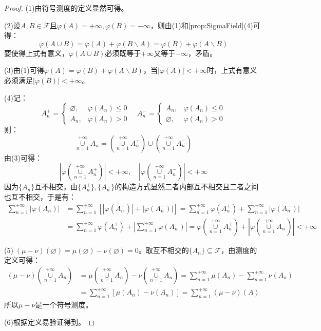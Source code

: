 \begin{proof}
	(1)由符号测度的定义显然可得。\par
	(2)设$A,B\in\mathscr{F}$且$\varphi(A)=+\infty,\varphi(B)=-\infty$，则由(1)和\cref{prop:SigmaField}(4)可得：
	\begin{equation*}
		\varphi(A\cup B)=\varphi(A)+\varphi(B\backslash A)=\varphi(B)+\varphi(A\backslash B)
	\end{equation*}
	要使得上式有意义，$\varphi(A\cup B)$必须既等于$+\infty$又等于$-\infty$，矛盾。\par
	(3)由(1)可得$\varphi(A)=\varphi(B)+\varphi(A\backslash B)$，当$|\varphi(A)|<+\infty$时，上式有意义必须满足$|\varphi(B)|<+\infty$。\par
	(4)记：
	\begin{equation*}
		A_n^+=
		\begin{cases}
			\varnothing,&\varphi(A_n)\leqslant0 \\
			A_n,&\varphi(A_n)>0
		\end{cases}
		\quad
		A_n^-=
		\begin{cases}
			A_n,&\varphi(A_n)\leqslant0 \\
			\varnothing,&\varphi(A_n)>0
		\end{cases}
	\end{equation*}
	则：
	\begin{equation*}
		\underset{n=1}{\overset{+\infty}{\cup}}A_n=\left(\underset{n=1}{\overset{+\infty}{\cup}}A_n^+\right)\cup\left(\underset{n=1}{\overset{+\infty}{\cup}}A_n^-\right)
	\end{equation*}
	由(3)可得：
	\begin{equation*}
		\left|\varphi\left(\underset{n=1}{\overset{+\infty}{\cup}}A_n^+\right)\right|<+\infty,\quad
		\left|\varphi\left(\underset{n=1}{\overset{+\infty}{\cup}}A_n^-\right)\right|<+\infty
	\end{equation*}
	因为$\{A_n\}$互不相交，由$\{A_n^+\},\{A_n^-\}$的构造方式显然二者内部互不相交且二者之间也互不相交，于是有：
	\begin{align*}
		\sum_{n=1}^{+\infty}|\varphi(A_n)|&=\sum_{n=1}^{+\infty}[|\varphi(A_n^+)|+|\varphi(A_n^-)|] =\sum_{n=1}^{+\infty}\varphi(A_n^+)+\sum_{n=1}^{+\infty}|\varphi(A_n^-)| \\
		&=\sum_{n=1}^{+\infty}\varphi(A_n^+)+\left|\sum_{n=1}^{+\infty}\varphi(A_n^-)\right|
		=\varphi\left(\underset{n=1}{\overset{+\infty}{\cup}}A_n^+\right)+\left|\varphi\left(\underset{n=1}{\overset{+\infty}{\cup}}A_n^-\right)\right|<+\infty
	\end{align*}\par
	(5)$\;(\mu-\nu)(\varnothing)=\mu(\varnothing)-\nu(\varnothing)=0$。取互不相交的$\{A_n\}\subseteq\mathscr{F}$，由测度的定义可得：
	\begin{align*}
		(\mu-\nu)\left(\underset{n=1}{\overset{+\infty}{\cup}}A_n\right)&=\mu\left(\underset{n=1}{\overset{+\infty}{\cup}}A_n\right)-\nu\left(\underset{n=1}{\overset{+\infty}{\cup}}A_n\right)=\sum_{n=1}^{+\infty}\mu(A_n)-\sum_{n=1}^{+\infty}\nu(A_n) \\
		&=\sum_{n=1}^{+\infty}[\mu(A_n)-\nu(A_n)]=\sum_{n=1}^{+\infty}(\mu-\nu)(A)
	\end{align*}
	所以$\mu-\nu$是一个符号测度。\par
	(6)根据定义易验证得到。
\end{proof}
